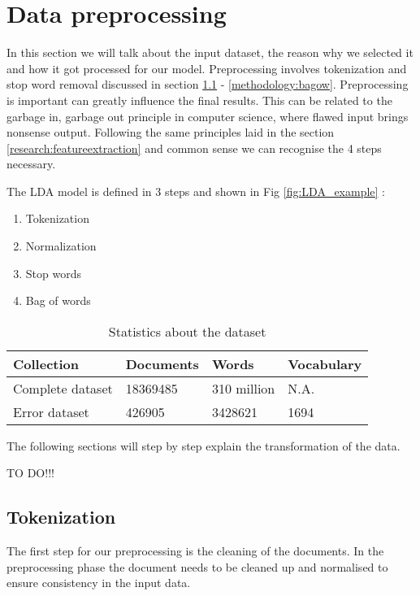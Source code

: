 \section{Data preprocessing}\label{methodology:Text preprocessing}
In this section we will talk about the input dataset, the reason why we selected it and how it got processed for our model. Preprocessing involves tokenization and stop word removal discussed in section \ref{methodology:tokenization} - \ref{methodology:bagow}. Preprocessing is important can greatly influence the final results. This can be related to the garbage in, garbage out principle in computer science, where flawed input brings nonsense output. Following the same principles laid in the section \ref{research:featureextraction} and common sense we can recognise the 4 steps necessary. 

The LDA model is defined in 3 steps and shown in Fig \ref{fig:LDA_example} :
\begin{enumerate}
    \item Tokenization
    \item Normalization
    \item Stop words
    \item Bag of words
    \end{enumerate}


\begin{table}[h]
\centering
 \begin{tabular}{|l|l|l|l|} 
 \hline
 Collection & Documents & Words & Vocabulary  \\ [0.5ex] 
 \hline\hline
 Complete dataset & 18369485 & 310 million & N.A.  \\ 
 Error dataset & 426905 & 3428621 & 1694 \\
 \hline
 \end{tabular}
\caption{Statistics about the dataset}
\label{tab:table2}
\end{table}

The following sections will step by step explain the transformation of the data.

TO DO!!!

\subsection{Tokenization}\label{methodology:tokenization}
The first step for our preprocessing is the cleaning of the documents. 
In the preprocessing phase the document needs to be cleaned up and normalised to ensure consistency in the input data.

